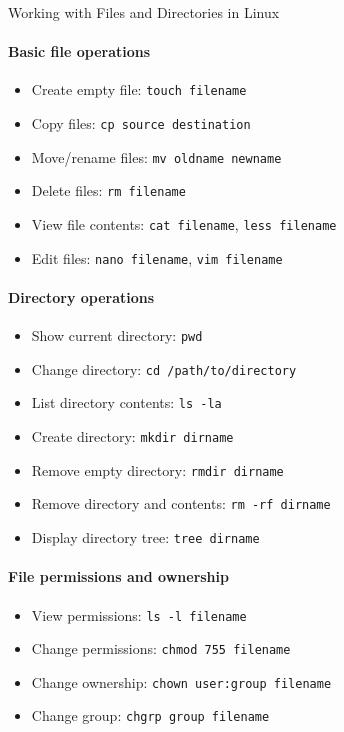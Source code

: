 \begin{KR}{Working with Files and Directories in Linux}\\
    \paragraph{Basic file operations}
    \begin{itemize}
        \item Create empty file: \texttt{touch filename}
        \item Copy files: \texttt{cp source destination}
        \item Move/rename files: \texttt{mv oldname newname}
        \item Delete files: \texttt{rm filename}
        \item View file contents: \texttt{cat filename}, \texttt{less filename}
        \item Edit files: \texttt{nano filename}, \texttt{vim filename}
    \end{itemize}
    
    \paragraph{Directory operations}
    \begin{itemize}
        \item Show current directory: \texttt{pwd}
        \item Change directory: \texttt{cd /path/to/directory}
        \item List directory contents: \texttt{ls -la}
        \item Create directory: \texttt{mkdir dirname}
        \item Remove empty directory: \texttt{rmdir dirname}
        \item Remove directory and contents: \texttt{rm -rf dirname}
        \item Display directory tree: \texttt{tree dirname}
    \end{itemize}
    
    \paragraph{File permissions and ownership}
    \begin{itemize}
        \item View permissions: \texttt{ls -l filename}
        \item Change permissions: \texttt{chmod 755 filename}
        \item Change ownership: \texttt{chown user:group filename}
        \item Change group: \texttt{chgrp group filename}
    \end{itemize}
    

\end{KR}

